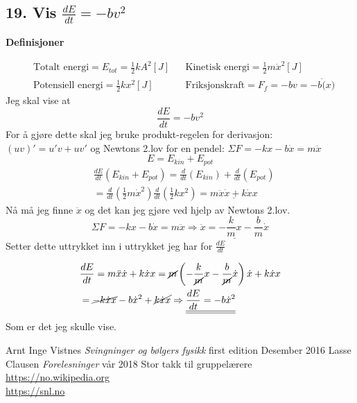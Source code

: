 \documentclass[a4paper,12pt,norsk]{article}
\newcommand{\uu}{\underline}
\begin{document}
\subsection{19. Vis $\frac{dE}{dt} = -bv^2$}

\begin{center}
\textbf{Definisjoner}
\end{center}
\begin{align*}
&\text{Totalt energi} = E_{tot} = \frac{1}{2}kA^2 [J]&& \text{Kinetisk energi} = \frac{1}{2}m\dot{x}^2[J]\\
&\text{Potensiell energi} = \frac{1}{2}kx^2 [J] &&\text{Friksjonskraft} = F_f = -bv = -b\dot(x)
\end{align*}
Jeg skal vise at 
$$
\frac{dE}{dt} = -bv^2
$$ 
For å gjøre dette skal jeg bruke produkt-regelen for derivasjon: \\$(uv)' = u'v+uv'$ og Newtons 2.lov for en pendel: $\Sigma F = -kx -b\dot{x} = m\ddot{x}$
$$E = E_{kin} + E_{pot}$$
\begin{align*}
&\frac{dE}{dt}(E_{kin} + E_{pot}) = \frac{d}{dt}(E_{kin})+\frac{d}{dt}(E_{pot})\\
&= \frac{d}{dt}\left(\frac{1}{2}m\dot{x}^2 \right) \frac{d}{dt}\left( \frac{1}{2}kx^2\right) = \uu{m\ddot{x}\dot{x} + k\dot{x}x}
\end{align*}
Nå må jeg finne $\ddot{x}$ og det kan jeg gjøre ved hjelp av Newtons 2.lov.
$$
\Sigma F = -kx -b\dot{x} = m\ddot{x} \Rightarrow \uu{\ddot{x} = -\frac{k}{m}x -\frac{b}{m}\dot{x}}
$$
Setter dette uttrykket inn i uttrykket jeg har for $\frac{dE}{dt}$

\begin{align*}
&\frac{dE}{dt} = m\ddot{x}\dot{x} + k\dot{x}x = \cancel{m}\left(-\frac{k}{\cancel{m}}x -\frac{b}{\cancel{m}}\dot{x}\right)\dot{x} + k\dot{x}x\\
&= \cancel{-k\dot{x}x} -b\dot{x}^2 + \cancel{k\dot{x}x} \Rightarrow \uu{\uu{ \frac{dE}{dt}=-b\dot{x}^2}}
\end{align*}
Som er det jeg skulle vise.







\newpage

\begin{thebibliography}{}
	Arnt Inge Vistnes
	\textit{Svingninger og bølgers fysikk}
	first edition
	Desember 2016
	Lasse Clausen
	\textit{Forelesninger}
	vår 2018
	Stor takk til gruppelærere
	\url{https://no.wikipedia.org}\\
	\url{https://snl.no}
\end{thebibliography}
\end{document}

